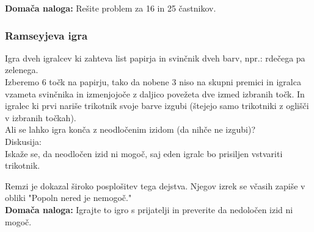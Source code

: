 \noindent
\textbf{Domača naloga:} Rešite problem za 16 in 25 častnikov.

\subsubsection{Ramseyjeva igra}
\begin{center}
    
\end{center}
Igra dveh igralcev ki zahteva list papirja in svinčnik dveh barv, npr.: rdečega pa zelenega. \\
Izberemo 6 točk na papirju, tako da nobene 3 niso na skupni premici in igralca vzameta svinčnika in izmenjojoče z daljico povežeta dve izmed izbranih točk. In igralec ki prvi nariše trikotnik svoje barve izgubi (štejejo samo trikotniki z oglišči v izbranih točkah). \\

\noindent
Ali se lahko igra konča z neodločenim izidom (da nihče ne izgubi)? \\

\noindent
Diskusija: \\
Iskaže se, da neodločen izid ni mogoč, saj eden igralc bo prisiljen vstvariti trikotnik.
\begin{center}
\end{center}
Remzi je dokazal široko posplošitev tega dejstva. Njegov izrek se včasih zapiše v obliki "Popoln nered je nemogoč." \\

\noindent
\textbf{Domača naloga:} Igrajte to igro s prijatelji in preverite da nedoločen izid ni mogoč.
